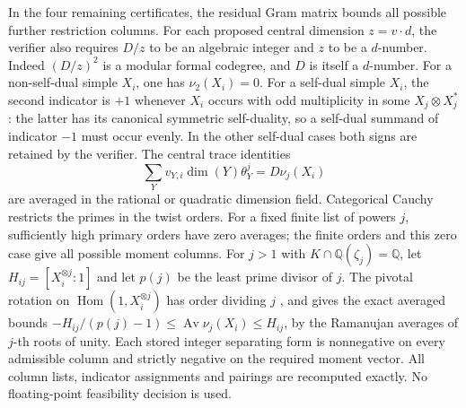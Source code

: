\documentclass[11pt,a4paper]{article}
\numberwithin{equation}{section}
\begin{document}
In the four remaining certificates, the residual Gram matrix bounds
all possible further restriction columns. For each proposed central
dimension $z=v\cdot d$, the verifier also requires $D/z$ to be an
algebraic integer and $z$ to be a $d$-number. Indeed $(D/z)^2$ is a
modular formal codegree, and $D$ is itself a $d$-number.
For a non-self-dual simple $X_i$, one has $\nu_2(X_i)=0$.
For a self-dual simple $X_i$, the second indicator is $+1$ whenever
$X_i$ occurs with odd multiplicity in some $X_j\otimes X_j^*$:
the latter has its canonical symmetric self-duality, so a self-dual
summand of indicator $-1$ must occur evenly. In the other self-dual
cases both signs are retained by the verifier. The central trace identities
\cite[Theorem~4.1]{NSExp}
\[
 \sum_Y v_{Y,i}\dim(Y)\theta_Y^j=D\nu_j(X_i)
\]
are averaged in the rational or quadratic dimension field. Categorical
Cauchy \cite[Theorem~3.9]{RankFinite} restricts the primes in the twist
orders. For a fixed finite list of powers $j$, sufficiently high
primary orders have zero averages; the finite orders and this zero
case give all possible moment columns. For $j>1$ with $K\cap\mathbb Q(\zeta_j)=\mathbb Q$, let $H_{ij}=[X_i^{\otimes j}:1]$ and let $p(j)$ be
the least prime divisor of $j$. The pivotal rotation on
$\operatorname{Hom}(1,X_i^{\otimes j})$ has order dividing $j$
\cite[Theorem~5.1]{NSPiv}, and gives the exact averaged bounds
$-H_{ij}/(p(j)-1)\le\operatorname{Av}\nu_j(X_i)\le H_{ij}$,
by the Ramanujan averages of $j$-th roots of unity.
Each stored integer separating form is nonnegative on every admissible
column and strictly negative on the required moment vector.
All column lists, indicator assignments and pairings are recomputed
exactly. No floating-point feasibility decision is used.
\end{document}
